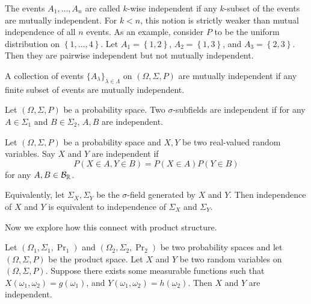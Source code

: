 \documentclass[a4paper]{article}
\begin{document}
\begin{remark}
  The events $A_1, \dots, A_n$ are called $k$-wise independent if
  any $k$-subset of the events are mutually independent. For $k < n$,
  this notion is strictly weaker than mutual independence of all
  $n$ events. As an example, consider $P$ to be the uniform distribution
  on $\left\{ 1, \dots, 4 \right\}$. Let $A_1 = \left\{ 1, 2 \right\}$,
  $A_2 = \left\{ 1, 3 \right\}$, and $A_3 = \left\{ 2, 3 \right\}$.
  Then they are pairwise independent but not mutually independent.
\end{remark}

\begin{defi}
  A collection of events $\{A_\lambda\}_{\lambda \in \Lambda}$
  on $(\Omega, \Sigma, P)$ are mutually independent if any finite subset
  of events are mutually independent.
\end{defi}

\begin{defi}
  Let $(\Omega, \Sigma, P)$ be a probability space. Two
  $\sigma$-subfields are independent if for any $A \in \Sigma_1$
  and $B \in \Sigma_2$, $A, B$ are independent.
\end{defi}

\begin{defi}
  Let $(\Omega, \Sigma, P)$ be a probability space and
  $X, Y$ be two real-valued random variables. Say $X$ and $Y$
  are independent if
  \[
    P \left( X \in A, Y \in B \right) = P \left( X \in A \right)
    P \left( Y \in B \right)
  \]
  for any $A, B \in \mathcal{B}_{\mathbb{R}}$.

  Equivalently, let $\Sigma_X, \Sigma_Y$
  be the $\sigma$-field generated by $X$ and $Y$. Then independence of
  $X$ and $Y$ is equivalent to independence of $\Sigma_X$ and $\Sigma_Y$.
\end{defi}

Now we explore how this connect with product structure.

\begin{prop}
  Let $(\Omega_1, \Sigma_1, \Pr_1)$ and $(\Omega_2, \Sigma_2, \Pr_2)$
  be two probability spaces and let $(\Omega, \Sigma, P)$ be the
  product space. Let $X$ and $Y$ be two random variables on
  $(\Omega, \Sigma, P)$. Suppose there exists some measurable
  functions such that $X (\omega_1, \omega_2) = g(\omega_1)$,
  and $Y(\omega_1, \omega_2) = h (\omega_2)$. Then $X$ and $Y$ are
  independent.
\end{prop}
\end{document}
